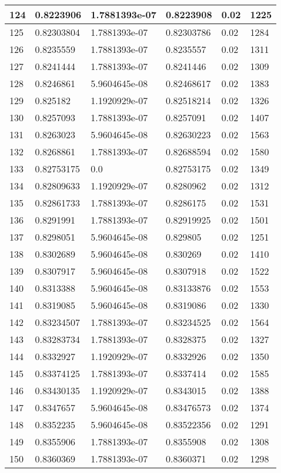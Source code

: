 \begin{longtable}{|l|l|l|l|l|l|}
124 & 0.8223906 & 1.7881393e-07 & 0.8223908 & 0.02 & 1225 \\ \hline 
125 & 0.82303804 & 1.7881393e-07 & 0.82303786 & 0.02 & 1284 \\ \hline 
126 & 0.8235559 & 1.7881393e-07 & 0.8235557 & 0.02 & 1311 \\ \hline 
127 & 0.8241444 & 1.7881393e-07 & 0.8241446 & 0.02 & 1309 \\ \hline 
128 & 0.8246861 & 5.9604645e-08 & 0.82468617 & 0.02 & 1383 \\ \hline 
129 & 0.825182 & 1.1920929e-07 & 0.82518214 & 0.02 & 1326 \\ \hline 
130 & 0.8257093 & 1.7881393e-07 & 0.8257091 & 0.02 & 1407 \\ \hline 
131 & 0.8263023 & 5.9604645e-08 & 0.82630223 & 0.02 & 1563 \\ \hline 
132 & 0.8268861 & 1.7881393e-07 & 0.82688594 & 0.02 & 1580 \\ \hline 
133 & 0.82753175 & 0.0 & 0.82753175 & 0.02 & 1349 \\ \hline 
134 & 0.82809633 & 1.1920929e-07 & 0.8280962 & 0.02 & 1312 \\ \hline 
135 & 0.82861733 & 1.7881393e-07 & 0.8286175 & 0.02 & 1531 \\ \hline 
136 & 0.8291991 & 1.7881393e-07 & 0.82919925 & 0.02 & 1501 \\ \hline 
137 & 0.8298051 & 5.9604645e-08 & 0.829805 & 0.02 & 1251 \\ \hline 
138 & 0.8302689 & 5.9604645e-08 & 0.830269 & 0.02 & 1410 \\ \hline 
139 & 0.8307917 & 5.9604645e-08 & 0.8307918 & 0.02 & 1522 \\ \hline 
140 & 0.8313388 & 5.9604645e-08 & 0.83133876 & 0.02 & 1553 \\ \hline 
141 & 0.8319085 & 5.9604645e-08 & 0.8319086 & 0.02 & 1330 \\ \hline 
142 & 0.83234507 & 1.7881393e-07 & 0.83234525 & 0.02 & 1564 \\ \hline 
143 & 0.83283734 & 1.7881393e-07 & 0.8328375 & 0.02 & 1327 \\ \hline 
144 & 0.8332927 & 1.1920929e-07 & 0.8332926 & 0.02 & 1350 \\ \hline 
145 & 0.83374125 & 1.7881393e-07 & 0.8337414 & 0.02 & 1585 \\ \hline 
146 & 0.83430135 & 1.1920929e-07 & 0.8343015 & 0.02 & 1388 \\ \hline 
147 & 0.8347657 & 5.9604645e-08 & 0.83476573 & 0.02 & 1374 \\ \hline 
148 & 0.8352235 & 5.9604645e-08 & 0.83522356 & 0.02 & 1291 \\ \hline 
149 & 0.8355906 & 1.7881393e-07 & 0.8355908 & 0.02 & 1308 \\ \hline 
150 & 0.8360369 & 1.7881393e-07 & 0.8360371 & 0.02 & 1298 \\ \hline 
\end{longtable}
